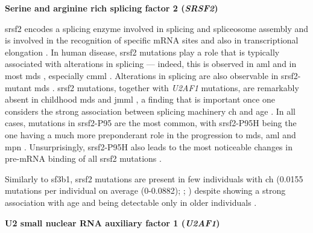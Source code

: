 \noindent \textbf{Serine and arginine rich splicing factor 2 (\textit{SRSF2})}

\Ac{srsf2} encodes a splicing enzyme involved in splicing and spliceosome assembly \cite{Fu1992-wy} and is involved in the recognition of specific mRNA sites \cite{Liu2000-ax} and also in transcriptional elongation \cite{Lin2008-tj}. In human disease, \ac{srsf2} mutations play a role that is typically associated with alterations in splicing --- indeed, this is observed in \ac{aml} \cite{Yoshimi2019-ax} and in most \ac{mds} \cite{Yoshida2011-zp,Makishima2012-wr}, especially \ac{cmml} \cite{Patnaik2013-cv,Meggendorfer2012-jn}. Alterations in splicing are also observable in \ac{srsf2}-mutant \ac{mds} \cite{Rahman2020-bh}. \ac{srsf2} mutations, together with \textit{U2AF1} mutations, are remarkably absent in childhood \ac{mds} and \ac{jmml} \cite{Hirabayashi2012-jj,Kar2013-nw}, a finding that is important once one considers  the strong association between splicing machinery \ac{ch} and age \cite{Yoshida2011-zp}. In all cases, mutations in \ac{srsf2}-P95 are the most common, with \ac{srsf2}-P95H being the one having a much more preponderant role in the progression to \ac{mds}, \ac{aml} and \ac{mpn} \cite{Wang2021-wg,Smeets2018-yv,Nagata2019-hn}. Unsurprisingly, \ac{srsf2}-P95H also leads to the most noticeable changes in pre-mRNA binding of all \ac{srsf2} mutations \cite{Zhang2015-xu,Komeno2015-pq}.

Similarly to \ac{sf3b1}, \ac{srsf2} mutations are present in few individuals with \ac{ch} \cite{Jaiswal2014-rl,Genovese2014-eu,Zink2017-zi,Bolton2020-ct,Coombs2017-ph,McKerrell2015-rl,Acuna-Hidalgo2017-ng,Desai2018-pj,Young2016-du,Young2019-rz} (0.0155 mutations per individual on average (0-0.0882); ; ) despite showing a strong association with age and being detectable only in older individuals \cite{Bolton2020-ct,McKerrell2015-rl}.

\noindent \textbf{U2 small nuclear RNA auxiliary factor 1 (\textit{U2AF1})}

